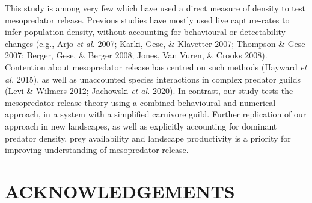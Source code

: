 \documentclass[preprint, 3p, authoryear]{elsarticle} %
\begin{document}
This study is among very few which have used a direct measure of density to test mesopredator release. Previous studies have mostly used live capture-rates to infer population density, without accounting for behavioural or detectability changes (e.g., Arjo \emph{et al.} 2007; Karki, Gese, \& Klavetter 2007; Thompson \& Gese 2007; Berger, Gese, \& Berger 2008; Jones, Van Vuren, \& Crooks 2008). Contention about mesopredator release has centred on such methods (Hayward \emph{et al.} 2015), as well as unaccounted species interactions in complex predator guilds (Levi \& Wilmers 2012; Jachowski \emph{et al.} 2020). In contrast, our study tests the mesopredator release theory using a combined behavioural and numerical approach, in a system with a simplified carnivore guild. Further replication of our approach in new landscapes, as well as explicitly accounting for dominant predator density, prey availability and landscape productivity is a priority for improving understanding of mesopredator release.

\newpage

\hypertarget{acknowledgements}{%
\section*{ACKNOWLEDGEMENTS}\label{acknowledgements}}
\end{document}
